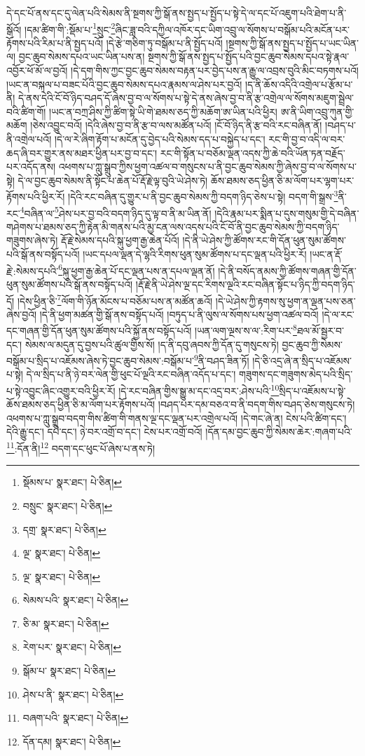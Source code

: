དེ་དང་པོ་ནས་དང་དུ་ལེན་པའི་སེམས་ནི་སྔགས་ཀྱི་སྒོ་ནས་སྤྱད་པ་སྤྱོད་པ་སྟེ་དེ་ལ་དང་པོ་འཇུག་པའི་ཐེག་པ་ནི་སྒོའོ། །དམ་ཚིག་གི་:སྡོམ་པ་\footnote{སྡོམས་པ་  སྣར་ཐང་།  པེ་ཅིན། }སྲུང་\footnote{བསྲུང་  སྣར་ཐང་།  པེ་ཅིན། }ཞིང་ཟླ་བའི་དཀྱིལ་འཁོར་དང་ཡིག་འབྲུ་ལ་སོགས་པ་བསྒོམ་པའི་མངོན་པར་རྟོགས་པའི་རིམ་པ་ནི་སྤྱད་པའོ། །དེ་རྩེ་གཅིག་ཏུ་བསྒོམ་པ་ནི་སྤྱོད་པའོ། །སྔགས་ཀྱི་སྒོ་ནས་སྤྱད་པ་སྤྱོད་པ་ཡང་ཡིན་ལ། བྱང་ཆུབ་སེམས་དཔའ་ཡང་ཡིན་པས་ན། སྔགས་ཀྱི་སྒོ་ནས་སྤྱད་པ་སྤྱོད་པའི་བྱང་ཆུབ་སེམས་དཔའ་སྟེ་རྣལ་འབྱོར་ཕོ་མོ་ལ་བྱའོ། །དེ་དག་གིས་ཀྱང་བྱང་ཆུབ་སེམས་བརྟན་པར་བྱེད་པས་ན་རྒྱུ་ལ་འབྲས་བུའི་མིང་བཏགས་པའོ། །ཡང་ན་བསྐལ་པ་བཟང་པོའི་བྱང་ཆུབ་སེམས་དཔའ་རྣམས་ལ་ཤེས་པར་བྱའོ། །ད་ནི་ཆོས་འདིའི་འགྲེལ་པ་རྩོམ་པ་ནི། དེ་ནས་དེའི་ངོ་བོ་ཉིད་བཤད་དོ་ཞེས་བྱ་བ་ལ་སོགས་པ་སྟེ་དེ་ནས་ཞེས་བྱ་བ་ནི་རྩ་འགྲེལ་ལ་སོགས་མཇུག་སྦྲེལ་བའི་ཚིག་གོ། །ཡང་ན་བཀྲ་ཤིས་ཀྱི་ཚིག་སྟེ་ཡི་གེ་ཐམས་ཅད་ཀྱི་མཆོག་ཨ་ཡིན་པའི་ཕྱིར། ཨ་ནི་ཡིག་འབྲུ་ཀུན་གྱི་མཆོག །ཅེས་འབྱུང་བའོ། །དེའི་ཞེས་བྱ་བ་ནི་རྩ་བ་ལས་མཚོན་པའོ། །ངོ་བོ་ཉིད་ནི་རྩ་བའི་རང་བཞིན་ནོ། །བཤད་པ་ནི་འགྲེལ་པའོ། །དེ་ལ་རེ་ཞིག་རྟོག་པ་མངོན་དུ་བྱེད་པའི་སེམས་དད་པ་བསྐྱེད་པ་དང་། རང་གི་བྱ་བ་འདི་ལ་བར་ཆད་ཞི་བར་གྱུར་ནས་མཐར་ཕྱིན་པར་བྱ་བ་དང་། རང་གི་སྟོན་པ་བཅོམ་ལྡན་འདས་ཀྱི་ཆེ་བའི་ཡོན་ཏན་བརྗོད་པར་འདོད་ནས། འཕགས་པ་ཀླུ་སྒྲུབ་ཀྱིས་ཕྱག་འཚལ་བ་གསུངས་པ་ནི་བྱང་ཆུབ་སེམས་ཀྱི་ཞེས་བྱ་བ་ལ་སོགས་པ་སྟེ། དེ་ལ་བྱང་ཆུབ་སེམས་ནི་སྟོང་པ་ཆེན་པོ་རྡོ་རྗེ་ལྟ་བུའི་ཡེ་ཤེས་ཏེ། ཆོས་ཐམས་ཅད་ཕྱིན་ཅི་མ་ལོག་པར་ལྷག་པར་རྟོགས་པའི་ཕྱིར་རོ། །དེའི་རང་བཞིན་དུ་གྱུར་པ་ནི་བྱང་ཆུབ་སེམས་ཀྱི་བདག་ཉིད་ཅེས་པ་སྟེ། བདག་གི་སྒྲས་\footnote{དགྲ་  སྣར་ཐང་།  པེ་ཅིན། }ནི་རང་\footnote{ལྔ་  སྣར་ཐང་།  པེ་ཅིན། }བཞིན་ལ་\footnote{ལྔ་  སྣར་ཐང་།  པེ་ཅིན། }ཤེས་པར་བྱ་བའི་བདག་ཉིད་དུ་ལྟ་བ་ནི་མ་ཡིན་ནོ། །དེའི་རྣམ་པར་སྨིན་པ་དུས་གསུམ་གྱི་དེ་བཞིན་གཤེགས་པ་ཐམས་ཅད་ཀྱི་རྟེན་མི་གནས་པའི་མྱ་ངན་ལས་འདས་པའི་ངོ་བོ་ནི་བྱང་ཆུབ་སེམས་ཀྱི་བདག་ཉིད་གཟུགས་ཞེས་ཏེ། རྡོ་རྗེ་སེམས་དཔའི་སྐུ་ཕྱག་རྒྱ་ཆེན་པོའོ། །དེ་ནི་ཡེ་ཤེས་ཀྱི་ཚོགས་རང་གི་དོན་ཕུན་སུམ་ཚོགས་པའི་སྒོ་ནས་བསྟོད་པའོ། །ཡང་དཔལ་ལྡན་དེ་ལྷའི་རིགས་ཕུན་སུམ་ཚོགས་པ་དང་ལྡན་པའི་ཕྱིར་རོ། །ཡང་ན་རྡོ་རྗེ་:སེམས་དཔའི་\footnote{སེམས་པའི་  སྣར་ཐང་།  པེ་ཅིན། }སྐུ་ཕྱག་རྒྱ་ཆེན་པོ་དང་ལྡན་པས་ན་དཔལ་ལྡན་ནོ། །དེ་ནི་བསོད་ནམས་ཀྱི་ཚོགས་གཞན་གྱི་དོན་ཕུན་སུམ་ཚོགས་པའི་སྒོ་ནས་བསྟོད་པའོ། །རྡོ་རྗེ་ནི་ཡེ་ཤེས་ལྔ་དང་རིགས་ལྔའི་རང་བཞིན་སྟོང་པ་ཉིད་ཀྱི་བདག་ཉིད་དོ། །དེས་ཕྱིན་ཅི་\footnote{ཅི་མ་  སྣར་ཐང་།  པེ་ཅིན། }ལོག་གི་ཉོན་མོངས་པ་བཅོམ་པས་ན་མཚོན་ཆའོ། །དེ་ཡེ་ཤེས་ཀྱི་རྟགས་སུ་ཕྱག་ན་ལྡན་པས་ཅན་ཞེས་བྱའོ། །དེ་ནི་ཕྱག་མཚན་གྱི་སྒོ་ནས་བསྟོད་པའོ། །བཏུད་པ་ནི་ལུས་ལ་སོགས་པས་ཕྱག་འཚལ་བའོ། །དེ་ལ་རང་དང་གཞན་གྱི་དོན་ཕུན་སུམ་ཚོགས་པའི་སྐྱོ་ནས་བསྟོད་པའོ། །ཡན་ལག་ལྔས་ས་ལ་:རིག་པར་\footnote{རེག་པར་  སྣར་ཐང་།  པེ་ཅིན། }ཐལ་མོ་སྦྱར་བ་དང་། སེམས་ལ་མདུན་དུ་བྱས་པའི་ཚུལ་གྱིས་སོ། །ད་ནི་དབུ་ཞབས་ཀྱི་དོན་དུ་གསུངས་ཏེ། བྱང་ཆུབ་ཀྱི་སེམས་བསྒོམ་པ་སྲིད་པ་འཇོམས་ཞེས་ཏེ་བྱང་ཆུབ་སེམས་:བསྒོམ་པ་\footnote{སྒོམ་པ་  སྣར་ཐང་།  པེ་ཅིན། }ནི་བཤད་ཟིན་ཏོ། །དེ་ཅི་འདྲ་ཞེ་ན་སྲིད་པ་འཇོམས་པ་སྟེ། དེ་ལ་སྲིད་པ་ནི་ཉེ་བར་ལེན་གྱི་ཕུང་པོ་ལྔའི་རང་བཞིན་འདོད་པ་དང་། གཟུགས་དང་གཟུགས་མེད་པའི་སྲིད་པ་སྟེ་འབྱུང་ཞིང་འགྱུར་བའི་ཕྱིར་རོ། །དེ་རང་བཞིན་གྱིས་སྒྱུ་མ་དང་འདྲ་བར་:ཤེས་པའི་\footnote{ཤེས་པ་ནི་  སྣར་ཐང་།  པེ་ཅིན། }སྲིད་པ་འཇོམས་པ་སྟེ་ཆོས་ཐམས་ཅད་ཕྱིན་ཅི་མ་ལོག་པར་རྟོགས་པའོ། །བཤད་པར་དམ་བཅའ་བ་ནི་བདག་གིས་བཤད་ཅེས་གསུངས་ཏེ། འཕགས་པ་ཀླུ་སྒྲུབ་བདག་གིས་ཚིག་གི་གནས་ལྔ་དང་ལྡན་པར་འགྲེལ་པའོ། །དེ་གང་ཞེ་ན། ངེས་པའི་ཚིག་དང་། དེའི་རྒྱུ་དང་། དཔེ་དང་། ཉེ་བར་འགྲོ་བ་དང་། ངེས་པར་འགྲོ་བའོ། །དོན་དམ་བྱང་ཆུབ་ཀྱི་སེམས་ཆེར་:གཞག་པའི་\footnote{བཞག་པའི་  སྣར་ཐང་།  པེ་ཅིན། }:དོན་ནི།\footnote{དོན་དམ།  སྣར་ཐང་།  པེ་ཅིན། } བདག་དང་ཕུང་པོ་ཞེས་པ་ནས་ཏེ། 